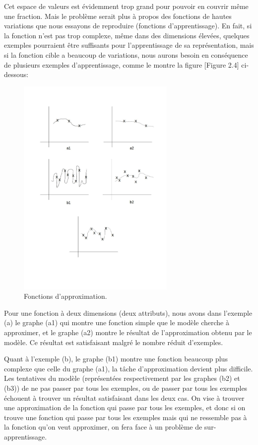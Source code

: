 	Cet espace de valeurs est évidemment trop grand pour pouvoir en couvrir même une fraction. Mais le problème serait plus à propos des fonctions de hautes variations que nous essayons de reproduire (fonctions d'apprentissage). En fait, si la fonction n'est pas trop complexe, même dans des dimensions élevées, quelques exemples pourraient être suffisants pour l'apprentissage de sa représentation, mais si la fonction cible a beaucoup de variations, nous aurons besoin en conséquence de plusieurs exemples d'apprentissage, comme le montre la figure [Figure 2.4] ci-dessous:

\begin{figure}[H]
	\centering
		\includegraphics[width=3in]{Figures/highVariation.jpg}
	\caption[FA]{Fonctions d'approximation.}
	\label{fig:Electron}
\end{figure}


	Pour une fonction à deux dimensions (deux attributs), nous avons dans l'exemple (a) le graphe (a1) qui montre une fonction simple que le modèle cherche à approximer, et le graphe (a2) montre le résultat de l'approximation obtenu par le modèle. Ce résultat est satisfaisant malgré le nombre réduit d'exemples.

	Quant à l'exemple (b), le graphe (b1) montre une fonction beaucoup plus complexe que celle du graphe (a1), la tâche d'approximation devient plus difficile. Les tentatives du modèle (représentées respectivement par les graphes (b2) et (b3)) de ne pas passer par tous les exemples, ou de passer par tous les exemples échouent à trouver un résultat satisfaisant dans les deux cas. On vise à trouver une approximation de la fonction qui passe par tous les exemples, et donc si on trouve une fonction qui passe par tous les exemples mais qui ne ressemble pas à la fonction qu'on veut approximer, on fera face à un problème de sur-apprentissage.


